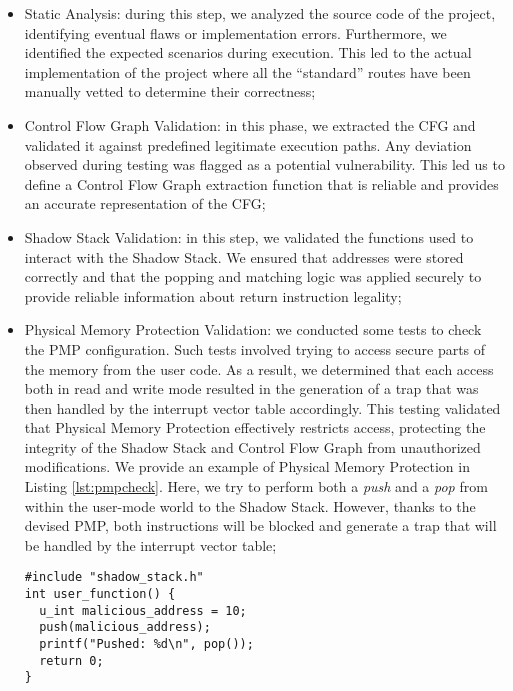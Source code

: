 \begin{itemize}
  \item Static Analysis: during this step, we analyzed the source code of the project,
    identifying eventual flaws or implementation errors. Furthermore, we
    identified the expected scenarios during execution. This led to the actual implementation
    of the project where all the ``standard'' routes have been manually vetted to
    determine their correctness;

  \item Control Flow Graph Validation: in this phase, we extracted the CFG and validated
    it against predefined legitimate execution paths. Any deviation observed
    during testing was flagged as a potential vulnerability. This led us to define
    a Control Flow Graph extraction function that is reliable and provides an accurate
    representation of the CFG;

  \item Shadow Stack Validation: in this step, we validated the functions used to
    interact with the Shadow Stack. We ensured that addresses were stored
    correctly and that the popping and matching logic was applied securely to
    provide reliable information about return instruction legality;

  \item Physical Memory Protection Validation: we conducted some tests to check
    the PMP configuration. Such tests involved trying to access secure parts of the
    memory from the user code. As a result, we determined that each access both in
    read and write mode resulted in the generation of a trap that was then handled
    by the interrupt vector table accordingly. This testing validated that
    Physical Memory Protection effectively restricts access, protecting the integrity
    of the Shadow Stack and Control Flow Graph from unauthorized modifications.
    We provide an example of Physical Memory Protection in Listing
    \ref{lst:pmpcheck}. Here, we try to perform both a \textit{push} and a \textit{pop}
    from within the user-mode world to the Shadow Stack. However, thanks to the
    devised PMP, both instructions will be blocked and generate a trap that will
    be handled by the interrupt vector table;

    \begin{lstlisting}[style=CStyle, caption = PMP configuration validation, label={lst:pmpcheck}]
#include "shadow_stack.h"
int user_function() {
  u_int malicious_address = 10;
  push(malicious_address);
  printf("Pushed: %d\n", pop());
  return 0;
}
 \end{lstlisting}


\end{itemize}
